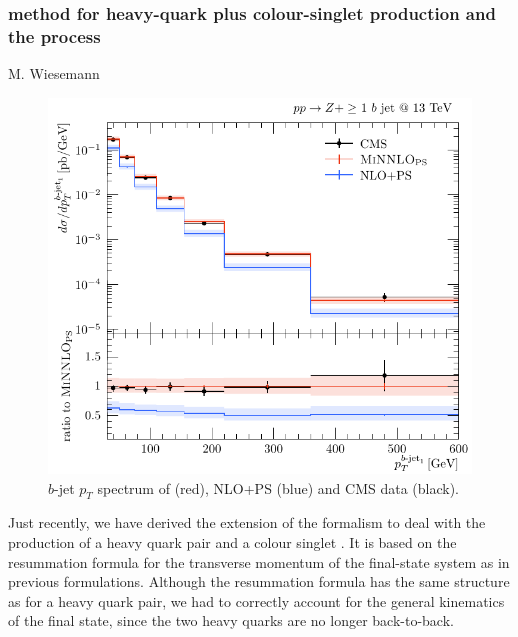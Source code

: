 \documentclass{FBR_Bericht_2025}
\begin{document}
\begin{refsection}
%
\subsubsection[\minnlo{} method for heavy-quark plus colour-singlet production and application to $b\bar{b}Z$ process]{\minnlo{} method for heavy-quark plus colour-singlet production and the  process}
\begin{Namen}
M. Wiesemann
\end{Namen}
%

\begin{figure}[b!]
\begin{center}
\includegraphics[width=0.95\linewidth]{plots/bbZ_ptbjet.pdf}
\caption{$b$-jet $p_T$ spectrum of \minnlo{} (red), NLO+PS (blue) and CMS data (black).}
\label{fig:bbZ}
\end{center}
\end{figure}

Just recently, we have derived the extension of the \minnlo{} formalism to deal with the production of a heavy quark pair and a colour singlet \cite{Mazzitelli:2024ura}.
It is based on the resummation formula for the transverse momentum of the final-state system as in previous \minnlo{} 
formulations. Although the resummation formula has the same structure as for a heavy quark pair, we had to correctly
account for the general kinematics of the final state, since the two heavy quarks are no longer back-to-back.


\end{refsection}
\end{document}
